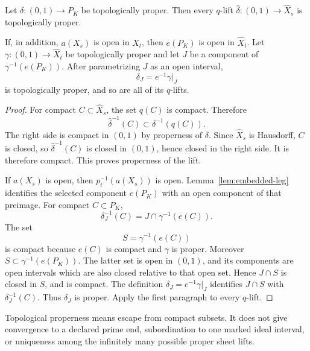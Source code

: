 \begin{proposition}\label{prop:properness}
Let \( \delta\colon(0,1)\to P_K \) be topologically proper.  Then every \( q \)-lift \( \widehat\delta\colon(0,1)\to\widehat X_s \) is topologically proper.

If, in addition, \( a(X_s) \) is open in \( X_t \), then \( e(P_K) \) is open in \( \widehat X_t \).  Let \( \gamma\colon(0,1)\to\widehat X_t \) be topologically proper and let \( J \) be a component of \( \gamma^{-1}(e(P_K)) \).  After parametrizing \( J \) as an open interval,
\[
  \delta_J=e^{-1}\gamma|_J
\]
is topologically proper, and so are all of its \( q \)-lifts.
\end{proposition}

\begin{proof}
For compact \( C\subset\widehat X_s \), the set \( q(C) \) is compact.  Therefore
\[
  \widehat\delta^{-1}(C)\subset\delta^{-1}(q(C)).
\]
The right side is compact in \( (0,1) \) by properness of \( \delta \).  Since \( \widehat X_s \) is Hausdorff, \( C \) is closed, so \( \widehat\delta^{-1}(C) \) is closed in \( (0,1) \), hence closed in the right side.  It is therefore compact.  This proves properness of the lift.

If \( a(X_s) \) is open, then \( p_t^{-1}(a(X_s)) \) is open.  Lemma~\ref{lem:embedded-leg} identifies the selected component \( e(P_K) \) with an open component of that preimage.  For compact \( C\subset P_K \),
\[
  \delta_J^{-1}(C)=J\cap\gamma^{-1}(e(C)).
\]
The set
\[
  S=\gamma^{-1}(e(C))
\]
is compact because \( e(C) \) is compact and \( \gamma \) is proper.  Moreover \( S\subset\gamma^{-1}(e(P_K)) \).  The latter set is open in \( (0,1) \), and its components are open intervals which are also closed relative to that open set.  Hence \( J\cap S \) is closed in \( S \), and is compact.  The definition \( \delta_J=e^{-1}\gamma|_J \) identifies \( J\cap S \) with \( \delta_J^{-1}(C) \).  Thus \( \delta_J \) is proper.  Apply the first paragraph to every \( q \)-lift.
\end{proof}

\begin{remark}
Topological properness means escape from compact subsets.  It does not
give convergence to a declared prime end, subordination to one marked
ideal interval, or uniqueness among the infinitely many possible
proper sheet lifts.
\end{remark}